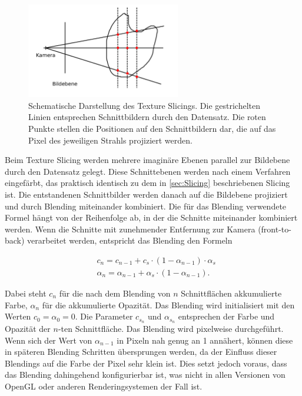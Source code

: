 \documentclass[a4paper,fontsize=12pt,toc=bib,parskip=half,ngerman]{scrartcl}
\begin{document}
\begin{figure}
	\centering
	\includegraphics[width=0.6\textwidth]{pictures/Texture_Slicing}
	\caption{Schematische Darstellung des Texture Slicings. Die gestrichelten Linien entsprechen Schnittbildern durch den Datensatz. Die roten Punkte stellen die Positionen auf den Schnittbildern dar, die auf das Pixel des jeweiligen Strahls projiziert werden.}
	\label{TextureSlicing}
\end{figure}

Beim Texture Slicing werden mehrere imagin\"are Ebenen parallel zur Bildebene durch den Datensatz gelegt. Diese Schnittebenen werden nach einem Verfahren eingef\"arbt, das praktisch identisch zu dem in \cref{sec:Slicing} beschriebenen Slicing ist. Die entstandenen Schnittbilder werden danach auf die Bildebene projiziert und durch Blending miteinander kombiniert. Die f\"ur das Blending verwendete Formel h\"angt von der Reihenfolge ab, in der die Schnitte miteinander kombiniert werden. Wenn die Schnitte mit zunehmender Entfernung zur Kamera (front-to-back) verarbeitet werden, entspricht das Blending den Formeln

\begin{align}
&c_n = c_{n-1} + c_{s}\cdot(1-\alpha_{n-1})\cdot\alpha_{s}
\label{front-to-back-color}\\ 
&\alpha_n = \alpha_{n-1} + \alpha_{s}\cdot(1-\alpha_{n-1}).
\label{front-to-back-alpha}
\end{align}

Dabei steht $c_n$ f\"ur die nach dem Blending von $n$ Schnittfl\"achen akkumulierte Farbe, $\alpha_n$ f\"ur die akkumulierte Opazit\"at. Das Blending wird initialisiert mit den Werten $c_0 = \alpha_0 = 0$. Die Parameter $c_{s_n}$ und $\alpha_{s_n}$ entsprechen der Farbe und Opazit\"at der $n$-ten Schnittfl\"ache. Das Blending wird pixelweise durchgef\"uhrt. Wenn sich der Wert von $\alpha_{n-1}$ in Pixeln nah genug an 1 ann\"ahert, k\"onnen diese in sp\"ateren Blending Schritten \"ubersprungen werden, da der Einfluss dieser Blendings auf die Farbe der Pixel sehr klein ist. Dies setzt jedoch voraus, dass das Blending dahingehend konfigurierbar ist, was nicht in allen Versionen von OpenGL oder anderen Renderingsystemen der Fall ist. 
\end{document}
